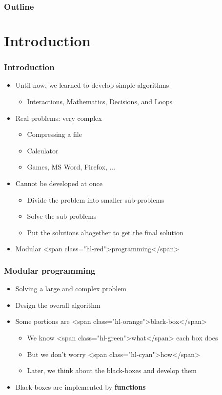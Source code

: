 \documentclass{../c-lecture}
\subtitle{Functions}
\begin{document}
\begin{frame}
  \titlepage{}
\end{frame}
\begin{frame}
  \frametitle{Outline}
  \tableofcontents{}
\end{frame}

\section{Introduction}

\begin{frame}
  \frametitle{Introduction}
  \begin{itemize}
    \item Until now, we learned to develop simple algorithms
    \begin{itemize}
      \item Interactions, Mathematics, Decisions, and Loops
    \end{itemize}
    \item Real problems: very complex
    \begin{itemize}
      \item Compressing a file
      \item Calculator
      \item Games, MS Word, Firefox, ...
    \end{itemize}
    \item Cannot be developed at once
    \begin{itemize}
      \item Divide the problem into smaller sub-problems
      \item Solve the sub-problems
      \item Put the solutions altogether to get the final solution
    \end{itemize}
    \item Modular <span class="hl-red">programming</span>
  \end{itemize}
\end{frame}

\begin{frame}
  \frametitle{Modular programming}
  \begin{itemize}
    \item Solving a large and complex problem
    \item Design the overall algorithm
    \item Some portions are <span class="hl-orange">black-box</span>
    \begin{itemize}
      \item We know <span class="hl-green">what</span> each box does
      \item But we don't worry <span class="hl-cyan">how</span>
      \item Later, we think about the black-boxes and develop them
    \end{itemize}
    \item
      Black-boxes are implemented by \textbf{\color{RubineRed} functions}
  \end{itemize}
\end{frame}
\end{document}

